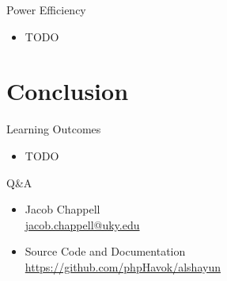\documentclass{beamer}
\begin{document}
\begin{frame}{Power Efficiency}
    \begin{itemize}
        \item TODO
    \end{itemize}
\end{frame}

\section{Conclusion}

\begin{frame}{Learning Outcomes}
    \begin{itemize}
        \item TODO
    \end{itemize}
\end{frame}

\begin{frame}{Q\&A}
    \begin{itemize}
        \item \begin{center}
                Jacob Chappell \\
                \href{mailto:jacob.chappell@uky.edu}{jacob.chappell@uky.edu}
                \vfill
        \end{center}
        \item \begin{center}
                Source Code and Documentation \\ \url{https://github.com/phpHavok/alshayun}
        \end{center}
    \end{itemize}
\end{frame}
\end{document}
